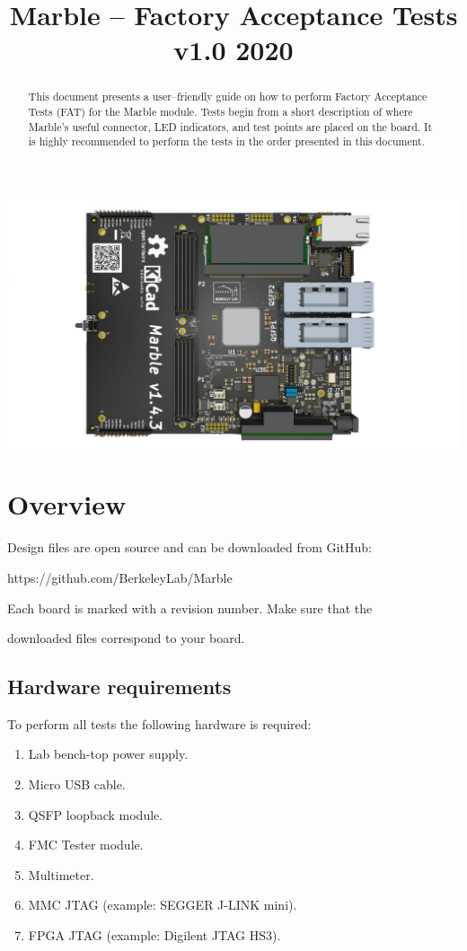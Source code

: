 \documentclass[12pt,oneside,a4]{article}
\title{Marble -- Factory Acceptance Tests\\ \small{v1.0 2020}}
\begin{document}
\maketitle
\begin{center}
\includegraphics[width=0.8\linewidth]{marble_top.png}
\end{center}
\begin{abstract}
This document presents a user--friendly guide on how to perform Factory Acceptance Tests (FAT) for the Marble module. Tests begin from a short description of where Marble's useful connector, LED indicators, and test points are placed on the board. It is highly recommended to perform the tests in the order presented in this document.
\end{abstract}

\clearpage
\tableofcontents

\clearpage

\section{Overview}

\begin{leftbar}
Design files are open source and can be downloaded from GitHub:

https://github.com/BerkeleyLab/Marble
\end{leftbar}


\begin{leftbar}
Each board is marked with a revision number. Make sure that the

downloaded files correspond to your board.
\end{leftbar}

\subsection{Hardware requirements}
To perform all tests the following hardware is required:
\begin{enumerate}
    \item Lab bench-top power supply.
    \item Micro USB cable.
    \item QSFP loopback module.
    \item FMC Tester module.
    \item Multimeter.
    \item MMC JTAG (example: SEGGER J-LINK mini).
    \item FPGA JTAG (example: Digilent JTAG HS3).
\end{enumerate}
\end{document}
